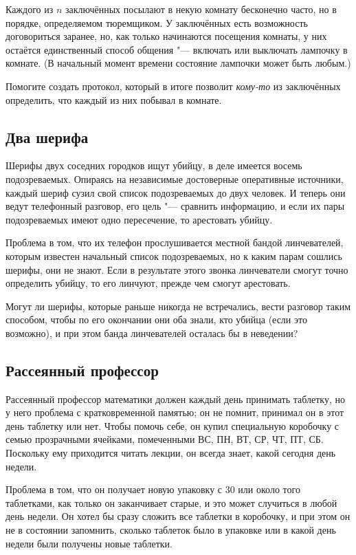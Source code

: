 \documentclass[twoside]{book}
\makeatletter
\newcommand{\rindex}[2][\imki@jobname]{%
  \index[#1]{\detokenize{#2}}%
}
\makeatother
\begin{document}
Каждого из $n$ заключённых посылают в некую комнату бесконечно часто, но в порядке, определяемом тюремщиком.
У заключённых есть возможность договориться заранее, но, как только начинаются посещения комнаты, у них остаётся единственный способ общения "--- включать или выключать лампочку в комнате.
(В начальный момент времени состояние лампочки может быть любым.)

Помогите создать протокол, который в итоге позволит \emph{кому-то} из заключённых определить, что каждый из них побывал в комнате.

\subsection*{Два шерифа}%
\rindex{Два шерифа}

Шерифы двух соседних городков ищут убийцу, в деле имеется восемь подозреваемых.
Опираясь на независимые достоверные оперативные источники, каждый шериф сузил свой список подозреваемых до двух человек.
И теперь они ведут телефонный разговор, его цель "--- сравнить информацию, и если их пары подозреваемых имеют одно пересечение, то арестовать убийцу.

Проблема в том, что их телефон прослушивается местной бандой линчевателей, которым известен начальный список подозреваемых, но к каким парам сошлись шерифы, они не знают.
Если в результате этого звонка линчеватели смогут точно определить убийцу, то его линчуют, прежде чем смогут арестовать.

Могут ли шерифы, которые раньше никогда не встречались, вести разговор таким способом, чтобы по его окончании они оба знали, кто убийца (если это возможно), и при этом банда линчевателей осталась бы в неведении?

\subsection*{Рассеянный профессор}%
\rindex{Рассеянный профессор}

Рассеянный профессор математики должен каждый день принимать таблетку, но у него проблема с кратковременной памятью; он не помнит, принимал он в этот день таблетку или нет.
Чтобы помочь себе, он купил специальную коробочку с семью прозрачными ячейками, помеченными ВС, ПН, ВТ, СР, ЧТ, ПТ, СБ.
Поскольку ему приходится читать лекции, он всегда знает, какой сегодня день недели.

Проблема в том, что он получает новую упаковку с 30 или около того таблетками, как только он заканчивает старые, и это может случиться в любой день недели.
Он хотел бы сразу сложить все таблетки в коробочку, и при этом он не в состоянии запомнить, сколько таблеток было в упаковке или в какой день недели были получены новые таблетки.
\end{document}
